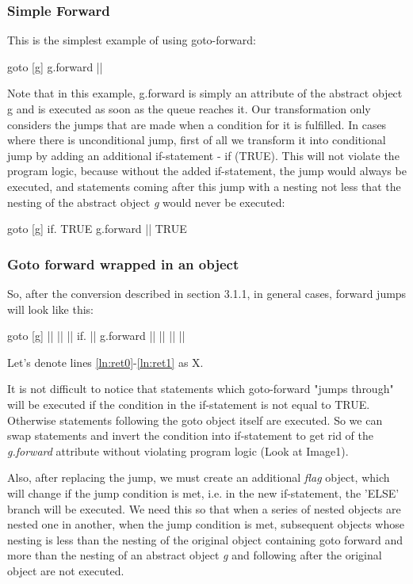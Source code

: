 \documentclass[sigplan,review,11pt,nonacm,natbib=false]{acmart}
\begin{document}
\subsubsection{Simple Forward}
This is the simplest example of using goto-forward:

\begin{ffcode}
goto
  [g]
    g.forward ||
\end{ffcode}

Note that in this example, g.forward is simply an attribute of the abstract object g and is executed as soon as the queue reaches it.
Our transformation only considers the jumps that are made when a condition for it is fulfilled. In cases where there is unconditional jump, first of all we transform it into conditional jump by adding an additional if-statement - if (TRUE).
This will not violate the program logic, because without the added if-statement, the jump would always be executed, and statements coming after this jump with a nesting not less that the nesting of the abstract object \emph{g} would never be executed:

\begin{ffcode}
goto
  [g]
    if.
      TRUE
      g.forward ||
      TRUE
\end{ffcode}

\subsubsection{Goto forward wrapped in an object}
So, after the conversion described in section 3.1.1, in general cases, forward jumps will look like this:
\begin{ffcode}
goto
  [g]
    || |$\label{ln:ret0}$|
      ||
      if.
        ||
        g.forward ||
        ||
      || |$\label{ln:ret1}$|
\end{ffcode}

Let's denote lines \ref{ln:ret0}-\ref{ln:ret1} as X.

It is not difficult to notice that statements which goto-forward "jumps through" will be executed if the condition in the if-statement is not equal to TRUE.
Otherwise statements following the goto object itself are executed.
So we can swap statements and invert the condition into if-statement to get rid of the \emph{g.forward} attribute without violating program logic (Look at Image1).

Also, after replacing the jump, we must create an additional \emph{flag} object, which will change if the jump condition is met, i.e. in the new if-statement, the 'ELSE' branch will be executed. We need this so that when a series of nested objects are nested one in another, when the jump condition is met, subsequent objects whose nesting is less than the nesting of the original object containing goto forward and more than the nesting of an abstract object \emph{g} and following after the original object are not executed.
\end{document}
